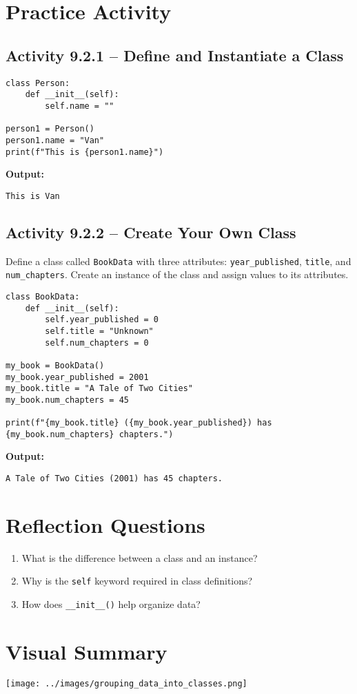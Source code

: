 \section{Practice Activity}

\subsection*{Activity 9.2.1 – Define and Instantiate a Class}

\begin{verbatim}
class Person:
    def __init__(self):
        self.name = ""

person1 = Person()
person1.name = "Van"
print(f"This is {person1.name}")
\end{verbatim}

\textbf{Output:}
\begin{verbatim}
This is Van
\end{verbatim}

\subsection*{Activity 9.2.2 – Create Your Own Class}

Define a class called \texttt{BookData} with three attributes:
\texttt{year\_published}, \texttt{title}, and \texttt{num\_chapters}.
Create an instance of the class and assign values to its attributes.

\begin{verbatim}
class BookData:
    def __init__(self):
        self.year_published = 0
        self.title = "Unknown"
        self.num_chapters = 0

my_book = BookData()
my_book.year_published = 2001
my_book.title = "A Tale of Two Cities"
my_book.num_chapters = 45

print(f"{my_book.title} ({my_book.year_published}) has {my_book.num_chapters} chapters.")
\end{verbatim}

\textbf{Output:}
\begin{verbatim}
A Tale of Two Cities (2001) has 45 chapters.
\end{verbatim}

\section*{Reflection Questions}
\begin{enumerate}
    \item What is the difference between a class and an instance?
    \item Why is the \texttt{self} keyword required in class definitions?
    \item How does \texttt{\_\_init\_\_()} help organize data?
\end{enumerate}

\section*{Visual Summary}
\begin{center}
\texttt{[image: ../images/grouping\_data\_into\_classes.png]}
\end{center}

